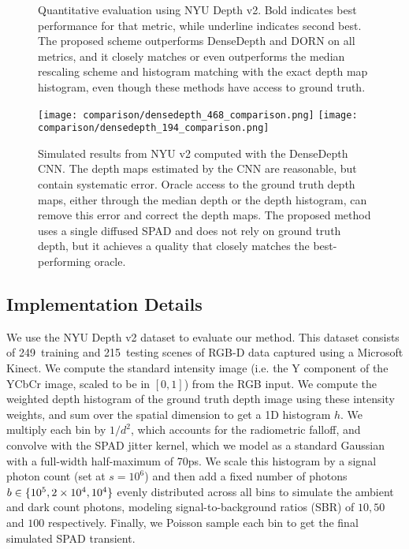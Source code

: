 \begin{figure*}[!t]
\begin{center}

\caption{Quantitative evaluation using NYU Depth v2. Bold indicates best performance for that metric, while underline indicates second best. The proposed scheme outperforms DenseDepth and DORN on all metrics, and it closely matches or even outperforms the median rescaling scheme and histogram matching with the exact depth map histogram, even though these methods have access to ground truth. }
\end{center}
\end{figure*}

\begin{figure*}[!t]
  \texttt{[image: comparison/densedepth\_468\_comparison.png]}
  \texttt{[image: comparison/densedepth\_194\_comparison.png]}
  \caption{Simulated results from NYU v2 computed with the DenseDepth CNN. The depth maps estimated by the CNN are reasonable, but contain systematic error. Oracle access to the ground truth depth maps, either through the median depth or the depth histogram, can remove this error and correct the depth maps. The proposed method uses a single diffused SPAD and does not rely on ground truth depth, but it achieves a quality that closely matches the best-performing oracle.}
	\label{fig:results_simulated}
\end{figure*}


\subsection{Implementation Details}

We use the NYU Depth v2 dataset to evaluate our method. This dataset consists of
249~training and 215~testing scenes of RGB-D data captured using a Microsoft
Kinect.
We compute the standard intensity image (i.e. the Y
component of the YCbCr image, scaled to be in $[0,1]$) from the RGB input. We compute the weighted depth
histogram of the ground truth depth image using these intensity weights, and sum
over the spatial dimension to get a 1D histogram $h$. We multiply each bin by
$1/d^2$, which accounts for the radiometric falloff, and convolve with the SPAD
jitter kernel, which we model as a standard Gaussian with a full-width
half-maximum of 70ps. We scale this histogram by a signal photon count (set at
$s = 10^6$) and then add a fixed number of photons $b \in \{10^5, 2\times 10^4, 10^4\}$ evenly distributed across all
bins to simulate the ambient and dark count photons, modeling
signal-to-background ratios (SBR) of $10, 50$ and $100$ respectively. Finally,
we Poisson sample each bin to get the final simulated SPAD transient.

